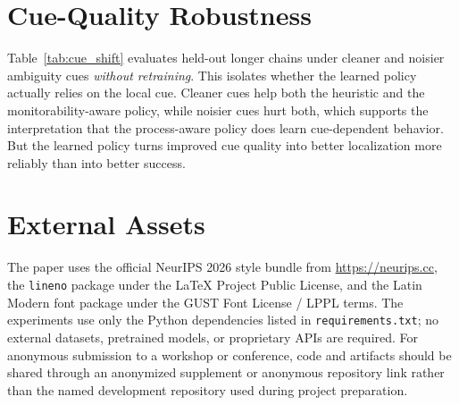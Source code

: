 \documentclass{article}
\begin{document}
\section{Cue-Quality Robustness}
Table~\ref{tab:cue_shift} evaluates held-out longer chains under cleaner and noisier ambiguity cues \emph{without retraining}. This isolates whether the learned policy actually relies on the local cue. Cleaner cues help both the heuristic and the monitorability-aware policy, while noisier cues hurt both, which supports the interpretation that the process-aware policy does learn cue-dependent behavior. But the learned policy turns improved cue quality into better localization more reliably than into better success.

\begin{table}[h]
\centering
\small
\caption{Held-out longer-chain performance under cleaner and noisier ambiguity cues, without retraining. Entries are mean $\pm$ standard error over five seeds.}
\label{tab:cue_shift}
\resizebox{\linewidth}{!}{}
\end{table}

\section{External Assets}
The paper uses the official NeurIPS 2026 style bundle from \url{https://neurips.cc}, the \texttt{lineno} package under the \LaTeX{} Project Public License, and the Latin Modern font package under the GUST Font License / LPPL terms. The experiments use only the Python dependencies listed in \texttt{requirements.txt}; no external datasets, pretrained models, or proprietary APIs are required. For anonymous submission to a workshop or conference, code and artifacts should be shared through an anonymized supplement or anonymous repository link rather than the named development repository used during project preparation.


\end{document}
